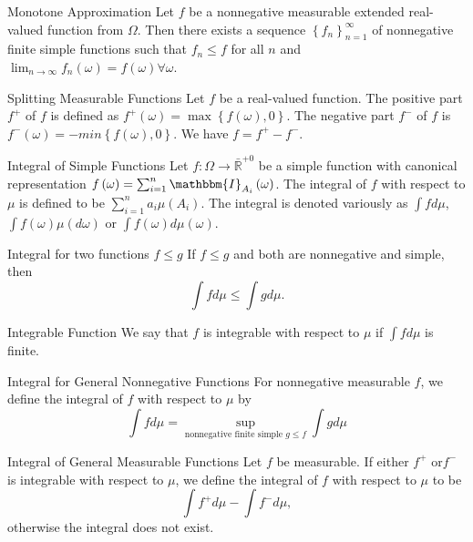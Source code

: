 \documentclass[avery5371,grid]{flashcards}
\begin{document}
\begin{flashcard}[Lemma]{Monotone Approximation}
 Let $f$ be a nonnegative measurable extended real-valued function from $\Omega$. Then there exists
 a sequence $\left\{ f_n \right\}_{n=1}^\infty$ of nonnegative finite simple functions
 such that $f_n \le f$ for all $n$ and $\lim_{n \to \infty} f_n\left( \omega \right) = f\left( \omega \right) \forall \omega$.
\end{flashcard}

\begin{flashcard}[Definition]{Splitting Measurable Functions}
Let $f$ be a real-valued function. The positive part $f^+$ of $f$ is defined as
$f^+\left( \omega \right) = \max \left\{ f\left( \omega \right), 0\right\}$. The negative part
$f^-$ of $f$ is $f^-\left( \omega \right)=-min\left\{ f\left( \omega \right), 0 \right\}$. We have
$f = f^+ - f^-$.
\end{flashcard}

\begin{flashcard}[Definition]{Integral of Simple Functions}
 Let $f : \Omega \to \bar{\mathbb{R}}^{+0}$ be a simple function with canonical 
 representation $f\left( \omega \right) = \sum_{i=1}^n \mathbbm{I}_{A_i}\left( \omega \right)$.
 The integral of $f$ with respect to $\mu$ is defined to be $\sum_{i=1}^n a_i \mu\left( A_i \right)$. The integral is denoted
 variously as $\int f d\mu$, $\int f\left( \omega \right) \mu\left( d\omega \right)$ or
 $\int f\left( \omega \right) d\mu\left( \omega \right)$.
\end{flashcard}

\begin{flashcard}[Proposition]{Integral for two functions $f \le g$}
If $f \le g$ and both are nonnegative and simple, then 
\[
\int f d\mu \le \int g d\mu.
\]
\end{flashcard}

\begin{flashcard}[Definition]{Integrable Function}
We say that $f$ is integrable with respect to $\mu$ if $\int f d\mu$ is finite. 
\end{flashcard}

\begin{flashcard}[Definition]{Integral for General Nonnegative Functions}
 For nonnegative measurable $f$, we define the integral of $f$ with respect to $\mu$ by
 \[
 \int f d\mu = \sup_{\text{nonnegative finite simple } g \le f} \int g d\mu 
 \]
\end{flashcard}

\begin{flashcard}[Definition]{Integral of General Measurable Functions}
Let $f$ be measurable. If either $f^+$ or$f^-$ is integrable with respect to $\mu$, we 
define the integral of $f$ with respect to $\mu$ to be 
\[
\int f^+ d\mu - \int f^- d\mu,
\]
 otherwise the integral does not exist.
\end{flashcard}
\end{document}
